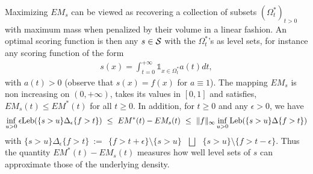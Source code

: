 %
\begin{center}
\label{EMcurve}
\end{center}
%
\noindent
Maximizing $EM_s$ can be viewed as recovering a collection of subsets $(\Omega^*_t)_{t>0}$ with maximum mass when penalized by their volume in a linear fashion. An optimal scoring function is then any $s\in \S$  with the $\Omega^*_t$'s as level sets, for instance any scoring function of the form
\begin{align*}
s(x)=\int_{t=0}^{+\infty} \mathds{1}_{x\in \Omega^*_t}a(t)dt,\end{align*}
with $a(t)>0$ (observe that $s(x)=f(x)$ for $a \equiv 1$).
%
The mapping $EM_s$ is non increasing on $(0,+\infty)$, takes its values in $[0,1]$ and satisfies, $EM_s(t) \le EM^*(t)$ for all $t\geq 0$. 
In addition, for $t \ge 0$ and any $\epsilon > 0$, we have 
\begin{align*}
\inf_{u>0} \epsilon \leb (\{ s >u\}\Delta_\epsilon \{f>t\}) ~\le~ EM^*(t)-EM_s(t) ~\le~ \|f\|_\infty \inf_{u>0} \leb (\{ s >u\}\Delta\{f>t\})
\end{align*}
with $\{ s >u\}\Delta_\epsilon \{f>t\} ~:=~~ \{f>t+\epsilon\} \setminus \{ s >u\} ~~~\bigsqcup~~~ \{ s >u\} \setminus \{f>t-\epsilon\}$. Thus the quantity $EM^*(t)-EM_s(t)$ measures how well level sets of $s$ can approximate those of the underlying density.
